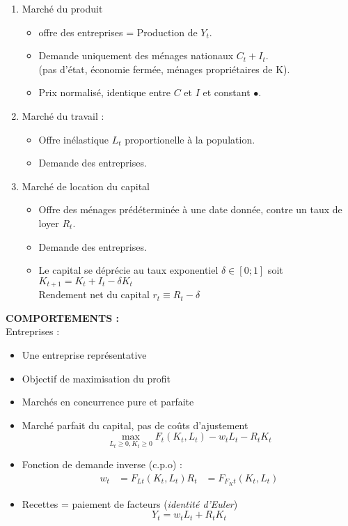 \documentclass{article}
\begin{document}
\begin{enumerate}
	\item Marché du produit
	\begin{itemize}
		\item offre des entreprises = Production de \(Y_t\).
		\item Demande uniquement des ménages nationaux \(C_t + I_t\). \\
		(pas d'état, économie fermée, ménages propriétaires de K).
		\item Prix normalisé, identique entre \(C\) et \(I\) et constant \(•\).
	\end{itemize}
	\item Marché du travail :
	\begin{itemize}
		\item Offre inélastique \(L_t\) proportionelle à la population.
		\item Demande des entreprises.
	\end{itemize}
	\item Marché de location du capital
	\begin{itemize}
		\item Offre des ménages prédéterminée à une date donnée, contre un taux de loyer \(R_t\).
		\item Demande des entreprises.
		\item Le capital se déprécie au taux exponentiel \(\delta \in [0;1]\) soit \(K_{t+1} = K_t + I_t - \delta K_t\) \\
		Rendement net du capital \(r_t \equiv R_t - \delta\)
	\end{itemize}
\end{enumerate}
\textbf{COMPORTEMENTS : } \\
Entreprises :
\begin{itemize}
	\item Une entreprise représentative
	\item Objectif de maximisation du profit
	\item Marchés en concurrence pure et parfaite
	\item Marché parfait du capital, pas de coûts d'ajustement
	\[\max_{L_t \geq 0, K_t \geq 0} F_t(K_t,L_t) - w_t L_t -R_tK_t\]
	\item Fonction de demande inverse (c.p.o) : 
	\begin{align*}
		w_t &= F_{Lt} (K_t, L_t)
		R_t &= F_{F_Kt} (K_t, L_t)
	\end{align*}
	\item Recettes = paiement de facteurs (\textit{identité d'Euler})
	\[Y_t = w_t L_t +R_t K_t\]
\end{itemize}
\end{document}
